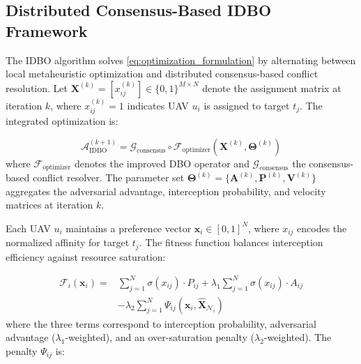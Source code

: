 \documentclass[lettersize,journal]{IEEEtran}
\begin{document}
\subsection{Distributed Consensus-Based IDBO Framework}
\label{subsec:idbo_algorithm}

The IDBO algorithm solves \eqref{eq:optimization_formulation} by alternating between local metaheuristic optimization and distributed consensus-based conflict resolution. Let $\mathbf{X}^{(k)} = [x_{ij}^{(k)}] \in \{0,1\}^{M \times N}$ denote the assignment matrix at iteration $k$, where $x_{ij}^{(k)}=1$ indicates UAV $u_i$ is assigned to target $t_j$. The integrated optimization is:

\begin{equation}
\label{eq:hierarchical}
\mathcal{A}_{\text{IDBO}}^{(k+1)} = \mathcal{G}_{\text{consensus}} \circ \mathcal{F}_{\text{optimizer}} \left( \mathbf{X}^{(k)}, \boldsymbol{\Theta}^{(k)} \right)
\end{equation}
where $\mathcal{F}_{\text{optimizer}}$ denotes the improved DBO operator and $\mathcal{G}_{\text{consensus}}$ the consensus-based conflict resolver. The parameter set $\boldsymbol{\Theta}^{(k)} = \{\mathbf{A}^{(k)}, \mathbf{P}^{(k)}, \mathbf{V}^{(k)}\}$ aggregates the adversarial advantage, interception probability, and velocity matrices at iteration $k$.

Each UAV $u_i$ maintains a preference vector $\mathbf{x}_i \in [0,1]^{N}$, where $x_{ij}$ encodes the normalized affinity for target $t_j$. The fitness function balances interception efficiency against resource saturation:

\begin{equation}
\label{eq:idbo_fitness}
\begin{split}
\mathcal{F}_i(\mathbf{x}_i) =& \sum_{j=1}^{N} \sigma(x_{ij}) \cdot P_{ij} + \lambda_1 \sum_{j=1}^{N} \sigma(x_{ij}) \cdot A_{ij} \\
&- \lambda_2 \sum_{j=1}^{N} \Psi_{ij}(\mathbf{x}_i, \hat{\mathbf{X}}_{\mathcal{N}_i})
\end{split}
\end{equation}
where the three terms correspond to interception probability, adversarial advantage ($\lambda_1$-weighted), and an over-saturation penalty ($\lambda_2$-weighted). The penalty $\Psi_{ij}$ is:
\end{document}
